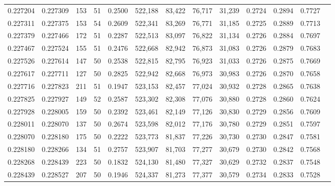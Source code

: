 \begin{tabular}{rrrrrrrrrrrrr}
0.227204 & 0.227309 &   153 &  51 &                                     0.2500 & 522,188 &  83,422 &  76,717 &  31,239 & 0.2724 & 0.2894 & 0.7727 \\
0.227311 & 0.227375 &   153 &  54 &                                     0.2609 & 522,341 &  83,269 &  76,771 &  31,185 & 0.2725 & 0.2889 & 0.7713 \\
0.227379 & 0.227466 &   172 &  51 &                                     0.2287 & 522,513 &  83,097 &  76,822 &  31,134 & 0.2726 & 0.2884 & 0.7697 \\
0.227467 & 0.227524 &   155 &  51 &                                     0.2476 & 522,668 &  82,942 &  76,873 &  31,083 & 0.2726 & 0.2879 & 0.7683 \\
0.227526 & 0.227614 &   147 &  50 &                                     0.2538 & 522,815 &  82,795 &  76,923 &  31,033 & 0.2726 & 0.2875 & 0.7669 \\
0.227617 & 0.227711 &   127 &  50 &                                     0.2825 & 522,942 &  82,668 &  76,973 &  30,983 & 0.2726 & 0.2870 & 0.7658 \\
0.227716 & 0.227823 &   211 &  51 &                                     0.1947 & 523,153 &  82,457 &  77,024 &  30,932 & 0.2728 & 0.2865 & 0.7638 \\
0.227825 & 0.227927 &   149 &  52 &                                     0.2587 & 523,302 &  82,308 &  77,076 &  30,880 & 0.2728 & 0.2860 & 0.7624 \\
0.227928 & 0.228005 &   159 &  50 &                                     0.2392 & 523,461 &  82,149 &  77,126 &  30,830 & 0.2729 & 0.2856 & 0.7609 \\
0.228011 & 0.228070 &   137 &  50 &                                     0.2674 & 523,598 &  82,012 &  77,176 &  30,780 & 0.2729 & 0.2851 & 0.7597 \\
0.228070 & 0.228180 &   175 &  50 &                                     0.2222 & 523,773 &  81,837 &  77,226 &  30,730 & 0.2730 & 0.2847 & 0.7581 \\
0.228180 & 0.228266 &   134 &  51 &                                     0.2757 & 523,907 &  81,703 &  77,277 &  30,679 & 0.2730 & 0.2842 & 0.7568 \\
0.228268 & 0.228439 &   223 &  50 &                                     0.1832 & 524,130 &  81,480 &  77,327 &  30,629 & 0.2732 & 0.2837 & 0.7548 \\
0.228439 & 0.228527 &   207 &  50 &                                     0.1946 & 524,337 &  81,273 &  77,377 &  30,579 & 0.2734 & 0.2833 & 0.7528 \\

\end{tabular}
